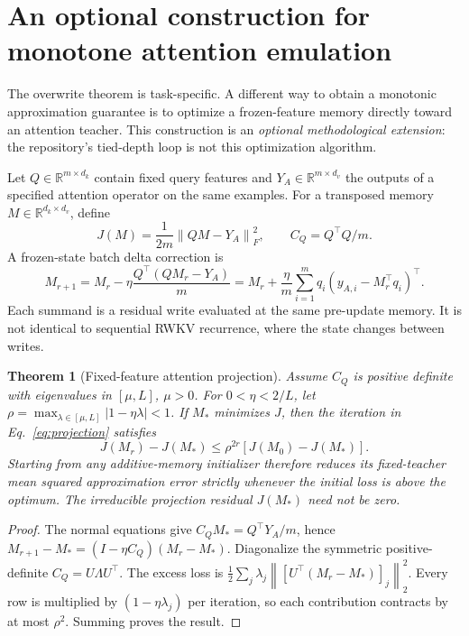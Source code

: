 \documentclass{article}
\newtheorem{theorem}{Theorem}[section]
\theoremstyle{remark}\newtheorem{remark}[theorem]{Remark}
\newcommand{\R}{\mathbb R}
\newcommand{\norm}[1]{\left\lVert #1\right\rVert}
\begin{document}
\section{An optional construction for monotone attention emulation}
\label{app:projection}
The overwrite theorem is task-specific. A different way to obtain a monotonic approximation guarantee is to optimize a frozen-feature memory directly toward an attention teacher. This construction is an \emph{optional methodological extension}: the repository's tied-depth loop is not this optimization algorithm.

Let $Q\in\R^{m\times d_k}$ contain fixed query features and $Y_A\in\R^{m\times d_v}$ the outputs of a specified attention operator on the same examples. For a transposed memory $M\in\R^{d_k\times d_v}$, define
\begin{equation}
 J(M)=\frac1{2m}\norm{QM-Y_A}_F^2,\qquad C_Q=Q^\top Q/m.
\end{equation}
A frozen-state batch delta correction is
\begin{equation}
 M_{r+1}=M_r-\eta\frac{Q^\top(QM_r-Y_A)}m
 =M_r+\frac\eta m\sum_{i=1}^{m}q_i(y_{A,i}-M_r^\top q_i)^\top.
 \label{eq:projection}
\end{equation}
Each summand is a residual write evaluated at the same pre-update memory. It is not identical to sequential RWKV recurrence, where the state changes between writes.

\begin{theorem}[Fixed-feature attention projection]
\label{thm:projection}
Assume $C_Q$ is positive definite with eigenvalues in $[\mu,L]$, $\mu>0$. For $0<\eta<2/L$, let
$\rho=\max_{\lambda\in[\mu,L]}|1-\eta\lambda|<1$.
If $M_*$ minimizes $J$, then the iteration in Eq.~\eqref{eq:projection} satisfies
\begin{equation}
 J(M_r)-J(M_*)\le\rho^{2r}[J(M_0)-J(M_*)].
\end{equation}
Starting from any additive-memory initializer therefore reduces its fixed-teacher mean squared approximation error strictly whenever the initial loss is above the optimum. The irreducible projection residual $J(M_*)$ need not be zero.
\end{theorem}
\begin{proof}
The normal equations give $C_QM_*=Q^\top Y_A/m$, hence
$M_{r+1}-M_*=(I-\eta C_Q)(M_r-M_*)$.
Diagonalize the symmetric positive-definite $C_Q=U\Lambda U^\top$. The excess loss is
$\tfrac12\sum_j\lambda_j\norm{[U^\top(M_r-M_*)]_j}_2^2$.
Every row is multiplied by $(1-\eta\lambda_j)$ per iteration, so each contribution contracts by at most $\rho^2$. Summing proves the result.
\end{proof}
\end{document}
